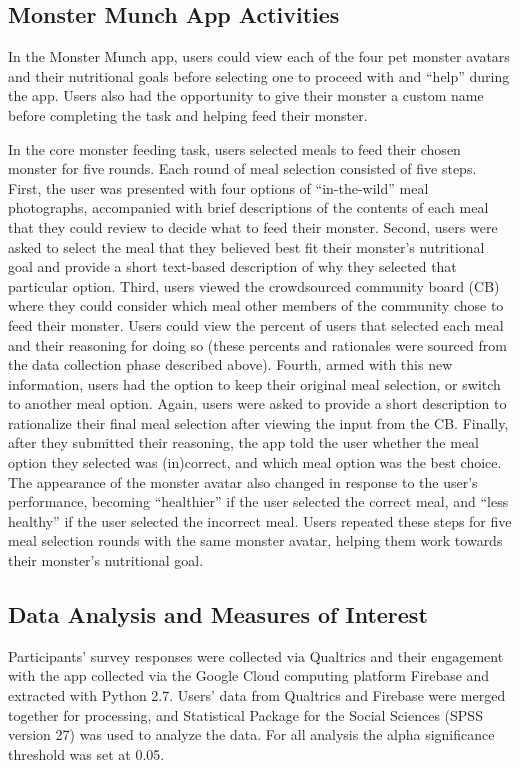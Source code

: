 \vspace{-5pt}
\subsection{Monster Munch App Activities}

In the Monster Munch app, users could view each of the four pet monster avatars and their nutritional goals before selecting one to proceed with and ``help'' during the app. Users also had the opportunity to give their monster a custom name before completing the task and helping feed their monster.

In the core monster feeding task, users selected meals to feed their chosen monster for five rounds. Each round of meal selection consisted of five steps. 
First, the user was presented with  four options of ``in-the-wild'' meal photographs, accompanied with brief descriptions of the contents of each meal that they could review to decide what to feed their monster. Second, users were asked to select the meal that they believed best fit their monster’s nutritional goal and provide a short text-based description of why they selected that particular option. Third, users viewed the crowdsourced community board (CB) where they could consider which meal other members of the community chose to feed their monster. Users could view the percent of users that selected each meal and their reasoning for doing so (these percents and rationales were sourced from the data collection phase described above). Fourth, armed with this new information, users had the option to keep their original meal selection, or switch to another meal option. Again, users were asked to provide a short description to rationalize their final meal selection after viewing the input from the CB.
Finally, after they submitted their reasoning, the app told the user whether the meal option they selected was (in)correct, and which meal option was the best choice. The appearance of the monster avatar also changed in response to the user's performance, becoming ``healthier'' if the user selected the correct meal, and ``less healthy'' if the user selected the incorrect meal. 
Users repeated these steps for five meal selection rounds with the same  monster avatar, helping them work towards their monster's nutritional goal.
\vspace{-5pt}
\subsection{Data Analysis and Measures of Interest}
Participants' survey responses were collected via Qualtrics and their engagement with the app  collected via the Google Cloud computing platform Firebase and extracted with Python 2.7. Users' data from Qualtrics and Firebase were merged together for processing, and 
Statistical Package for the Social Sciences (SPSS version 27) was used to analyze the data. For all analysis the alpha significance threshold was set at 0.05.  

